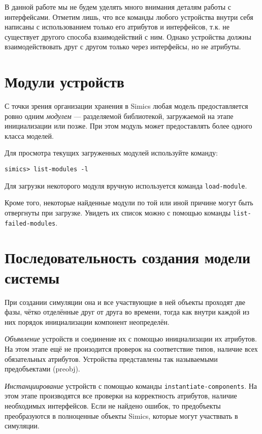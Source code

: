 В данной работе мы не будем уделять много внимания  деталям работы с интерфейсами. Отметим лишь, что все команды любого устройства внутри себя написаны с использованием только его атрибутов и интерфейсов, т.к. не существует другого способа взаимодействий с ним. Однако устройства должны взаимодействовать друг с другом только через интерфейсы, но не атрибуты.

\section{Модули устройств}

С точки зрения организации хранения в Simics любая модель предоставляется ровно одним \textit{модулем} --- разделяемой библиотекой, загружаемой на этапе инициализации или позже. При этом модуль может предоставлять более одного класса моделей.

Для просмотра текущих загруженных модулей используйте команду:

\begin{lstlisting}
simics> list-modules -l
\end{lstlisting}

Для загрузки некоторого модуля вручную используется команда \texttt{load-module}.

Кроме того, некоторые найденные модули по той или иной причине могут быть отвергнуты при загрузке. Увидеть их список можно с помощью команды \texttt{list-failed-modules}.

% 

\section{Последовательность создания модели системы}

При создании симуляции она и все участвующие в ней объекты проходят две фазы, чётко отделённые друг от друга во времени, тогда как внутри каждой из них порядок инициализации компонент неопределён.

\begin{enumerate*}

\item \textit{Объявление} устройств и соединение их с помощью инициализации их атрибутов. На этом этапе ещё не произодится проверок на соответствие типов, наличие всех обязательных атрибутов. Устройства представлены так называемыми предобъектами (\abbr preobj).

\item \textit{Инстанциирование} устройств с помощью команды \texttt{instantiate-components}. На этом этапе производятся все проверки на корректность атрибутов, наличие необходимых интерфейсов. Если не найдено ошибок, то предобъекты преобразуются в полноценные объекты Simics, которые могут участввать в симуляции.

\end{enumerate*}

